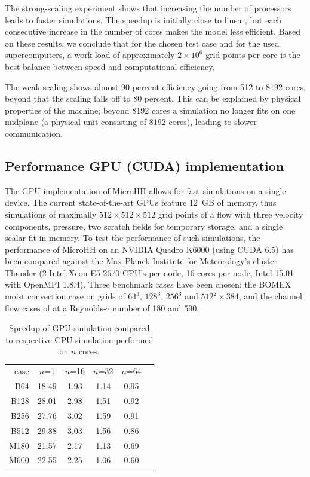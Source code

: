 \documentclass[gmd,manuscript]{copernicus}
\begin{document}
The strong-scaling experiment shows that increasing the number of processors leads to faster simulations. The speedup is initially close to linear, but each consecutive increase in the number of cores makes the model less efficient. Based on these results, we conclude that for the chosen test case and for the used supercomputers, a work load of approximately $2 \times 10^6$ grid points per core is the best balance between speed and computational efficiency.

The weak scaling shows almost 90 percent efficiency going from 512 to 8192 cores, beyond that the scaling falls off to 80 percent. This can be explained by physical properties of the machine;  beyond 8192 cores a simulation no longer fits on one midplane (a physical unit consisting of 8192 cores), leading to slower communication.

\subsection{Performance GPU (CUDA) implementation}
The GPU implementation of MicroHH allows for fast simulations on a single device. The current state-of-the-art GPUs feature 12~GB of memory, thus simulations of maximally $512 \times 512 \times 512$ grid points of a flow with three velocity components, pressure, two scratch fields for temporary storage, and a single scalar fit in memory. To test the performance of such simulations, the performance of MicroHH on an NVIDIA Quadro K6000 (using CUDA 6.5) has been compared against the Max Planck Institute for Meteorology's cluster Thunder (2 Intel Xeon E5-2670 CPU's per node, 16 cores per node, Intel 15.01 with OpenMPI 1.8.4). Three benchmark cases have been chosen: the BOMEX moist convection case on grids of $64^3$, $128^3$, $256^3$ and $512^2 \times 384$, and the channel flow cases of \citet{Moser1999} at a Reynolds-$\tau$ number of 180 and 590.

\begin{table}[t]
	\caption{Speedup of GPU simulation compared to respective CPU simulation performed on $n$ cores.}\label{tab:gpu}
	\begin{tabular}{rccccc}
		\tophline
		case & $n$=1 & $n$=16 & $n$=32 & $n$=64   \\
		\middlehline
		B64  & 18.49 & 1.93 & 1.14 & 0.95 \\
		B128 & 28.01 & 2.98 & 1.51 & 0.92 \\
		B256 & 27.76 & 3.02 & 1.59 & 0.91 \\
		B512 & 29.88 & 3.03 & 1.56 & 0.86 \\
		\middlehline
		M180 & 21.57 & 2.17 & 1.13 & 0.69 \\
		M600 & 22.55 & 2.25 & 1.06 & 0.60 \\
		\bottomhline
	\end{tabular}
\end{table}
\end{document}
